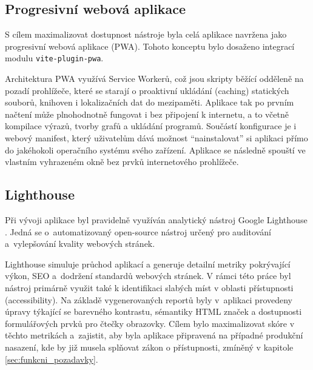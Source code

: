 \subsection{Progresivní webová aplikace}
S cílem maximalizovat dostupnost nástroje byla celá aplikace navržena jako progresivní webová aplikace (PWA). 
Tohoto konceptu bylo dosaženo integrací modulu \texttt{vite-plugin-pwa}. 

Architektura PWA využívá Service Workerů, což jsou skripty běžící odděleně na pozadí prohlížeče, které se starají o proaktivní ukládání (caching) statických souborů, knihoven i lokalizačních dat do mezipaměti. 
Aplikace tak po prvním načtení může plnohodnotně fungovat i bez připojení k internetu, a to včetně kompilace výrazů, tvorby grafů a ukládání programů. 
Součástí konfigurace je i webový manifest, který uživatelům dává možnost \enquote{nainstalovat} si aplikaci přímo do jakéhokoli operačního systému svého zařízení. 
Aplikace se následně spouští ve vlastním vyhrazeném okně bez prvků internetového prohlížeče.

\subsection{Lighthouse}
Při vývoji aplikace byl pravidelně využíván analytický nástroj Google Lighthouse \cite{chromefordevelopers_2016_overview}. 
Jedná se o~automatizovaný open-source nástroj určený pro auditování a~vylepšování kvality webových stránek. 

Lighthouse simuluje průchod aplikací a generuje detailní metriky pokrývající výkon, SEO a~dodržení standardů webových stránek. 
V rámci této práce byl nástroj primárně využit také k identifikaci slabých míst v oblasti přístupnosti (accessibility). 
Na základě vygenerovaných reportů byly v~aplikaci provedeny úpravy týkající se barevného kontrastu, sémantiky HTML značek a dostupnosti formulářových prvků pro čtečky obrazovky. 
Cílem bylo maximalizovat skóre v těchto metrikách a~zajistit, aby byla aplikace připravená na případné produkční nasazení, kde by již musela splňovat zákon o přístupnosti, zmíněný v kapitole \ref{sec:funkcni_pozadavky}.